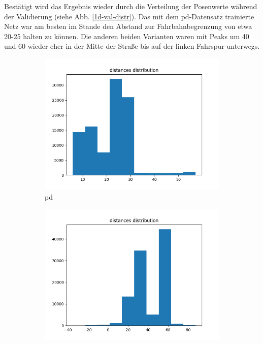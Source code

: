 Bestätigt wird das Ergebnis wieder durch die Verteilung der Posenwerte während der Validierung (siehe Abb. \ref{1d-val-distr}). Das mit dem \glqq\acs{pd}\grqq-Datensatz trainierte Netz war am besten im Stande den Abstand zur Fahrbahnbegrenzung von etwa 20-25 halten zu können. Die anderen beiden Varianten waren mit Peaks um 40 und 60 wieder eher in der Mitte der Straße bis auf der linken Fahrspur unterwegs.

\begin{figure}[H]
	\centering
	\begin{subfigure}[h]{0.3\textwidth}
		\centering
		\includegraphics[width=\linewidth]{kapitel5/images/eval/d-only/pd-distr.png}
		\caption{\glqq\acs{pd}\grqq}
		\label{1d-pd-val-distr}
	\end{subfigure}%
	\begin{subfigure}[h]{0.3\textwidth}
		\centering
		\includegraphics[width=\linewidth]{kapitel5/images/eval/d-only/pd-rand-distr.png}

\end{subfigure}
\end{figure}
